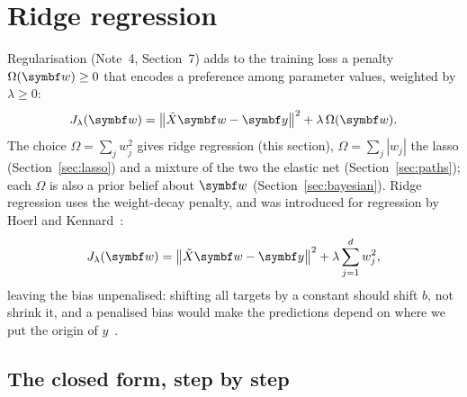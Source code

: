 \documentclass[11pt]{article}
\newcommand{\Xt}{\tilde X}
\newcommand{\w}{\vect{w}}
\newcommand{\y}{\vect{y}}
\begin{document}
\section{Ridge regression}\label{sec:ridge}

Regularisation (Note~4, Section~7) adds to the training loss a penalty $\Omega(\w) \ge 0$ that encodes a preference
among parameter values, weighted by $\lambda \ge 0$:
\[
  J_\lambda(\w) = \norm{\Xt\w - \y}^2 + \lambda\,\Omega(\w) .
\]
The choice $\Omega = \sum_j w_j^2$ gives ridge regression (this section), $\Omega = \sum_j |w_j|$ the lasso
(Section~\ref{sec:lasso}) and a mixture of the two the elastic net (Section~\ref{sec:paths}); each $\Omega$ is also a prior
belief about $\w$ (Section~\ref{sec:bayesian}). Ridge regression uses the weight-decay penalty, and was introduced for
regression by Hoerl and Kennard~\cite{hoerl1970}:
\begin{equation}\label{eq:ridge}
  J_\lambda(\w) = \norm{\Xt\w - \y}^2 + \lambda \sum_{j=1}^d w_j^2 ,
\end{equation}
leaving the bias unpenalised: shifting all targets by a constant should shift $b$, not shrink it, and a penalised bias
would make the predictions depend on where we put the origin of $y$~\cite[Section~3.4.1]{hastie2009}.

\subsection{The closed form, step by step}\label{sec:ridgeclosed}
\end{document}
